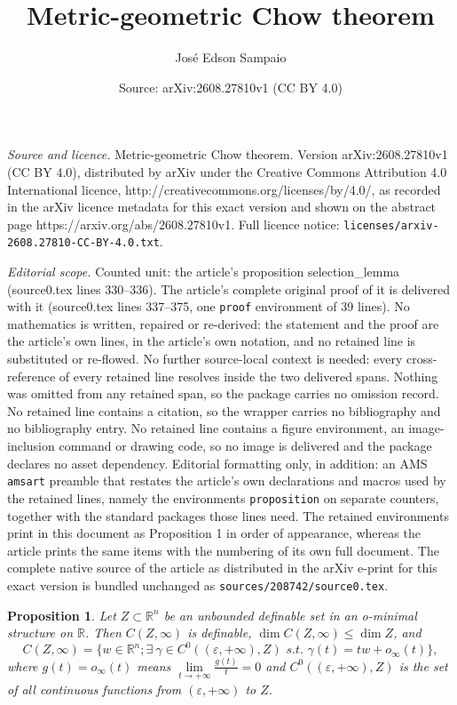 \documentclass[10pt,a4paper]{amsart}
\title{Metric-geometric Chow theorem}
\author{Jos\'e Edson Sampaio}
\date{Source: arXiv:2608.27810v1 (CC BY 4.0)}
\newtheorem{proposition}{Proposition}
\newcommand{\R}{\mathbb R}
\begin{document}
\maketitle

\noindent\emph{Source and licence.} Metric-geometric Chow theorem. Version arXiv:2608.27810v1 (CC BY 4.0), distributed by arXiv under the Creative Commons Attribution 4.0 International licence, http://creativecommons.org/licenses/by/4.0/, as recorded in the arXiv licence metadata for this exact version and shown on the abstract page https://arxiv.org/abs/2608.27810v1. Full licence notice: \texttt{licenses/arxiv-2608.27810-CC-BY-4.0.txt}.\par\smallskip

\noindent\textit{Editorial scope.} Counted unit: the article's proposition selection\_lemma (source0.tex lines 330--336). The article's complete original proof of it is delivered with it (source0.tex lines 337--375, one \texttt{proof} environment of 39 lines). No mathematics is written, repaired or re-derived: the statement and the proof are the article's own lines, in the article's own notation, and no retained line is substituted or re-flowed.  No further source-local context is needed: every cross-reference of every retained line resolves inside the two delivered spans.  Nothing was omitted from any retained span, so the package carries no omission record.  No retained line contains a citation, so the wrapper carries no bibliography and no bibliography entry.  No retained line contains a figure environment, an image-inclusion command or drawing code, so no image is delivered and the package declares no asset dependency.  Editorial formatting only, in addition: an AMS \texttt{amsart} preamble that restates the article's own declarations and macros used by the retained lines, namely the environments \texttt{proposition} on separate counters, together with the standard packages those lines need.  The retained environments print in this document as Proposition 1 in order of appearance, whereas the article prints the same items with the numbering of its own full document.  The complete native source of the article as distributed in the arXiv e-print for this exact version is bundled unchanged as \texttt{sources/208742/source0.tex}.
\begin{proposition}\label{selection_lemma}
Let $Z\subset \R^n$ be an unbounded definable set in an o-minimal structure on $\R$. Then $C(Z,\infty)$ is definable, $\dim C(Z,\infty)\leq \dim Z$, and 
$$
C(Z,\infty)=\{w\in \R^n; \exists\ \gamma\in C^0((\varepsilon ,+\infty ), Z) \,\,  s.t.\,\,\gamma(t)=tw+o_{\infty }(t)\},
$$ 
where $g(t)=o_{\infty }(t)$ means $\lim\limits _{t\to +\infty }\frac{g(t)}{t}=0$ and $C^0((\varepsilon ,+\infty ), Z)$ is the set of all continuous functions from $(\varepsilon ,+\infty )$ to $Z$. 
\end{proposition}
\end{document}

